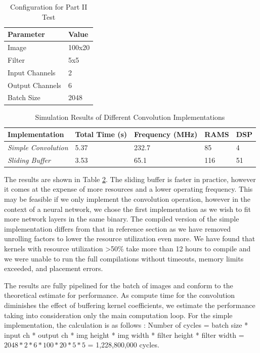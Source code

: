 \begin{table}[]
\centering
\begin{tabular}{|l|l|}
\hline
\textbf{Parameter} & \textbf{Value} \\ \hline
Image              & 100x20          \\ \hline
Filter             & 5x5            \\ \hline
Input Channels     & 2             \\ \hline
Output Channels    & 6             \\ \hline
Batch Size         & 2048           \\ \hline
\end{tabular}
\caption{Configuration for Part II Test}
\label{tab:l3params}
\end{table}

\begin{table}[]
\begin{tabular}{|l|l|l|l|l|}
\hline
\textbf{Implementation}     & \textbf{Total Time (s)} & \textbf{Frequency (MHz)} & \textbf{RAMS} & \textbf{DSP} \\ \hline
\textit{Simple Convolution} & 5.37                    & 232.7                    & 85            & 4            \\ \hline
\textit{Sliding Buffer}     & 3.53                    & 65.1                     & 116           & 51           \\ \hline
\end{tabular}
\caption{Simulation Results of Different Convolution Implementations }
\label{tab:resultparttw}
\end{table}

The results are shown in Table \ref{tab:resultparttw}. The sliding buffer is faster in practice, however it comes at the expense of more resources and a lower operating frequency. This may be feasible if we only implement the convolution operation, however in the context of a neural network, we chose the first implementation as we wish to fit more network layers in the same binary. The compiled version of the simple implementation differs from that in reference section as we have removed unrolling factors to lower the resource utilization even more. We have found that kernels with resource utilization >50\% take more than 12 hours to compile and we were unable to run the full compilations without timeouts, memory limits exceeded, and placement errors. 

The results are fully pipelined for the batch of images and conform to the theoretical estimate for performance. As compute time for the convolution diminishes the effect of buffering kernel coefficients, we estimate the performance taking into consideration only the main computation loop. For the simple implementation, the calculation is as follows : \newline Number of cycles = batch size * input ch * output ch * img height * img width * filter height * filter width  = $2048 * 2 * 6 * 100 * 20 * 5 * 5 $ = 1,228,800,000 cycles. 

